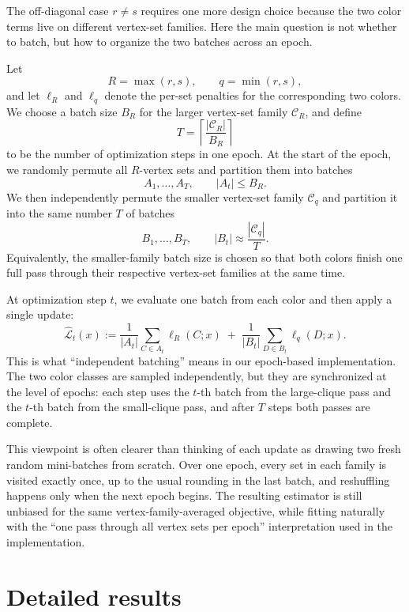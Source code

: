 \documentclass{article}
\begin{document}
The off-diagonal case $r \neq s$ requires one more design choice because the two color terms live on different vertex-set families. Here the main question is not whether to batch, but how to organize the two batches across an epoch.

Let
\[
R = \max(r,s), \qquad q = \min(r,s),
\]
and let $\ell_R$ and $\ell_q$ denote the per-set penalties for the corresponding two colors. We choose a batch size $B_R$ for the larger vertex-set family $\mathcal{C}_R$, and define
\[
T = \left\lceil \frac{|\mathcal{C}_R|}{B_R} \right\rceil
\]
to be the number of optimization steps in one epoch. At the start of the epoch, we randomly permute all $R$-vertex sets and partition them into batches
\[
A_1,\dots,A_T,
\qquad |A_t| \leq B_R.
\]
We then independently permute the smaller vertex-set family $\mathcal{C}_q$ and partition it into the same number $T$ of batches
\[
B_1,\dots,B_T,
\qquad |B_t| \approx \frac{|\mathcal{C}_q|}{T}.
\]
Equivalently, the smaller-family batch size is chosen so that both colors finish one full pass through their respective vertex-set families at the same time.

At optimization step $t$, we evaluate one batch from each color and then apply a single update:
\[
\widehat{\mathcal{L}}_t(x)
:=
\frac{1}{|A_t|}
\sum_{C \in A_t} \ell_R(C;x)
\;+\;
\frac{1}{|B_t|}
\sum_{D \in B_t} \ell_q(D;x).
\]
This is what ``independent batching'' means in our epoch-based implementation. The two color classes are sampled independently, but they are synchronized at the level of epochs: each step uses the $t$-th batch from the large-clique pass and the $t$-th batch from the small-clique pass, and after $T$ steps both passes are complete.

This viewpoint is often clearer than thinking of each update as drawing two fresh random mini-batches from scratch. Over one epoch, every set in each family is visited exactly once, up to the usual rounding in the last batch, and reshuffling happens only when the next epoch begins. The resulting estimator is still unbiased for the same vertex-family-averaged objective, while fitting naturally with the ``one pass through all vertex sets per epoch'' interpretation used in the implementation.


\section{Detailed results}




\newpage

\end{document}
